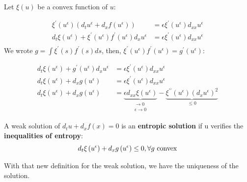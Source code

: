            Let $\xi\left(u\right) $ be a convex function of $u$:
            
            \begin{align*}
                \xi^\prime\left(u^\epsilon\right) \left(d_t u^\epsilon + d_x f\left(u^\epsilon\right)\right) &=  \epsilon \xi^\prime\left(u^\epsilon\right)d_{xx}u^\epsilon \\
                d_t \xi\left(u^\epsilon\right) + \xi^\prime\left(u^\epsilon\right)f^\prime\left(u^\epsilon\right)d_x u^\epsilon &= \epsilon \xi^\prime\left(u^\epsilon\right)d_{xx}u^\epsilon \\
            \end{align*}
            We wrote $g= \int \xi^\prime\left(s\right) f^\prime\left(s\right)ds$, then, $\xi^\prime\left(u^\epsilon\right) f^\prime\left(u^\epsilon\right) = g^\prime\left(u^\epsilon\right)$:
            
            \begin{align*}
                d_t\xi\left(u^\epsilon\right) + g^\prime\left(u^\epsilon\right)d_x u^\epsilon &= \epsilon \xi^\prime\left(u^\epsilon\right)d_{xx}u^\epsilon \\
                d_t\xi\left(u^\epsilon\right) + d_x g\left(u^\epsilon\right) &= \epsilon \xi^\prime\left(u^\epsilon\right)d_{xx}u^\epsilon \\
                d_t\xi\left(u^\epsilon\right) + d_x g\left(u^\epsilon\right) &= \underbrace{\epsilon d_{xx}\xi\left(u^\epsilon\right)}_{\substack{ \to 0 \\ \epsilon \to 0}} - \underbrace{\xi^{\prime\prime}\left(u^\epsilon\right)\left(d_xu^\epsilon\right)^2}_{\leq 0}
            \end{align*}
            
            \begin{definition}
                A weak solution of $ d_tu+d_xf\left(x\right)=0$ is an {\bf entropic solution} if u verifies the {\bf inequalities of entropy}:
                \begin{equation}
                    d_t\xi\left(u^\epsilon\right) + d_x g\left(u^\epsilon\right) \leq 0, \text{$ \forall g $ convex}
                \end{equation}
            \end{definition}
            
            With that new definition for the weak solution, we have the uniqueness of the solution.

